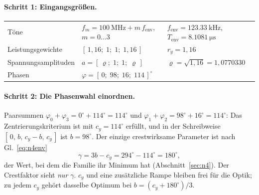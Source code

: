 \documentclass[11pt,a4paper]{article}
\begin{document}
\paragraph{Schritt 1: Eingangsgrößen.}
\begin{center}
\begin{tabular}{@{}lll@{}}
  \toprule
  Töne & $f_m = \SI{100}{\mega\hertz} + m\,f_\mathrm{env}$, $m=0\dots3$ & $f_\mathrm{env} = \SI{123.33}{\kilo\hertz}$, $T_\mathrm{env}=\SI{8.1081}{\micro\second}$\\
  Leistungsgewichte & $[\,1{,}16;\;1;\;1;\;1{,}16\,]$ & $r_y = 1{,}16$\\
  Spannungsamplituden & $a = [\,\varrho;\;1;\;1;\;\varrho\,]$ & $\varrho = \sqrt{1{,}16} = 1{,}0770330$\\
  Phasen & $\varphi = [\,0;\;98;\;16;\;114\,]^\circ$ & \\
  \bottomrule
\end{tabular}
\end{center}

\paragraph{Schritt 2: Die Phasenwahl einordnen.}
Paarsummen $\varphi_0+\varphi_3 = 0^\circ+114^\circ = 114^\circ$ und
$\varphi_1+\varphi_2 = 98^\circ+16^\circ = 114^\circ$: Das Zentrierungskriterium
ist mit $c_y = 114^\circ$ erfüllt, und in der Schreibweise
$[\,0,\,b,\,c_y-b,\,c_y\,]$ ist $b=98^\circ$. Der einzige crestwirksame
Parameter ist nach Gl.~\eqref{eq:n4env}
\begin{equation}
  \gamma = 3b - c_y = 294^\circ - 114^\circ = 180^\circ ,
\end{equation}
der Wert, bei dem die Familie ihr Minimum hat (Abschnitt~\ref{sec:n4}). Der
Crestfaktor sieht \emph{nur} $\gamma$. $c_y$ und eine zusätzliche Rampe
bleiben frei für die Optik; zu jedem $c_y$ gehört dasselbe Optimum bei
$b = (c_y+180^\circ)/3$.
\end{document}
